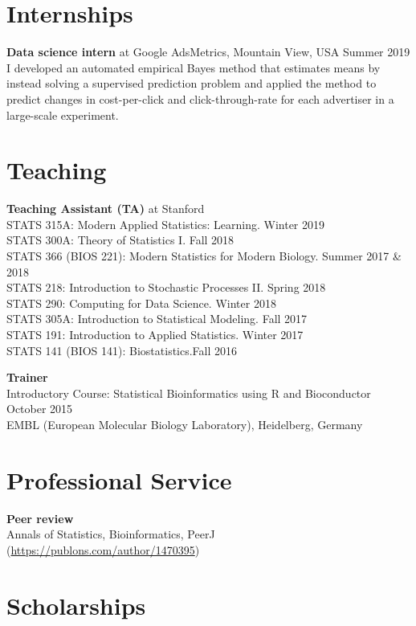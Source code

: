 \documentclass[margin,line]{res}
\newcommand{\ver}{\vspace*{-2.7mm}}
\begin{document}
\begin{resume}
\section{\sc Internships}
\textbf{Data science intern} at Google AdsMetrics, Mountain View, USA \hfill Summer 2019\\
I developed an automated empirical Bayes method that estimates means by instead solving a supervised prediction problem and applied the method to predict changes in cost-per-click and click-through-rate for each advertiser in a large-scale experiment.



\section{\sc Teaching}

\textbf{Teaching Assistant (TA)} at Stanford\\
STATS 315A: Modern Applied Statistics: Learning. \hfill Winter 2019\\
STATS 300A: Theory of Statistics I. \hfill Fall 2018\\
STATS 366 (BIOS 221): Modern Statistics for Modern Biology. \hfill Summer 2017 \& 2018\\
STATS 218: Introduction to Stochastic Processes II. \hfill Spring 2018\\
STATS 290: Computing for Data Science. \hfill Winter 2018\\
STATS 305A: Introduction to Statistical Modeling. \hfill Fall 2017\\
STATS 191: Introduction to Applied Statistics. \hfill Winter 2017\\
STATS 141 (BIOS 141): Biostatistics.\hfill Fall 2016

\ver
\textbf{Trainer}\\
Introductory Course: Statistical Bioinformatics using R and Bioconductor \hfill October 2015\\ EMBL (European Molecular Biology Laboratory), Heidelberg, Germany




\section{\sc Professional Service}

\textbf{Peer review}\\
Annals of Statistics, Bioinformatics, PeerJ (\url{https://publons.com/author/1470395})


\section{\sc Scholarships}



\end{resume}
\end{document}
